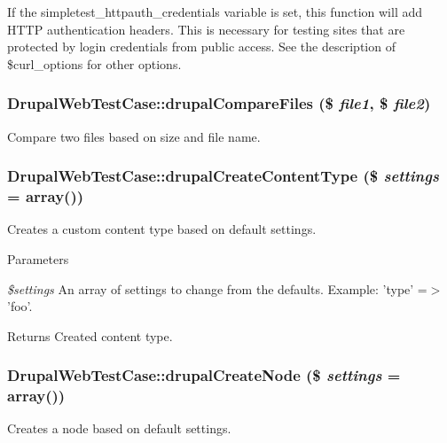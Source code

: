 If the simpletest\_\-httpauth\_\-credentials variable is set, this function will add HTTP authentication headers. This is necessary for testing sites that are protected by login credentials from public access. See the description of \$curl\_\-options for other options. \hypertarget{classDrupalWebTestCase_a7bdda4e6c7063f5dbcfecb1c70a03432}{
\subsubsection[{drupalCompareFiles}]{\setlength{\rightskip}{0pt plus 5cm}DrupalWebTestCase::drupalCompareFiles (\$ {\em file1}, \/  \$ {\em file2})}}
\label{classDrupalWebTestCase_a7bdda4e6c7063f5dbcfecb1c70a03432}
Compare two files based on size and file name. \hypertarget{classDrupalWebTestCase_a880b99e54830cd0a56e2f37b65ec337f}{
\subsubsection[{drupalCreateContentType}]{\setlength{\rightskip}{0pt plus 5cm}DrupalWebTestCase::drupalCreateContentType (\$ {\em settings} = {\ttfamily array()})}}
\label{classDrupalWebTestCase_a880b99e54830cd0a56e2f37b65ec337f}
Creates a custom content type based on default settings.


\begin{DoxyParams}{Parameters}
\item[{\em \$settings}]An array of settings to change from the defaults. Example: 'type' =$>$ 'foo'. \end{DoxyParams}
\begin{DoxyReturn}{Returns}
Created content type. 
\end{DoxyReturn}
\hypertarget{classDrupalWebTestCase_a73daf1ecd169e59a2acc47d57f06572f}{
\subsubsection[{drupalCreateNode}]{\setlength{\rightskip}{0pt plus 5cm}DrupalWebTestCase::drupalCreateNode (\$ {\em settings} = {\ttfamily array()})}}
\label{classDrupalWebTestCase_a73daf1ecd169e59a2acc47d57f06572f}
Creates a node based on default settings.


